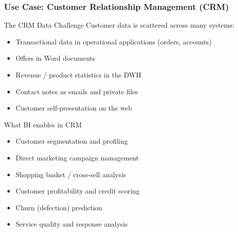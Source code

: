 \begin{frame}
  \frametitle{Use Case: Customer Relationship Management (CRM)}

  \begin{block}{The CRM Data Challenge}
    Customer data is scattered across many systems:
    \begin{itemize}
      \item Transactional data in operational applications (orders, accounts)
      \item Offers in Word documents
      \item Revenue / product statistics in the DWH
      \item Contact notes as emails and private files
      \item Customer self-presentation on the web
    \end{itemize}
  \end{block}

  \begin{block}{What BI enables in CRM}
    \begin{itemize}
      \item Customer segmentation and profiling
      \item Direct marketing campaign management
      \item Shopping basket / cross-sell analysis
      \item Customer profitability and credit scoring
      \item Churn (defection) prediction
      \item Service quality and response analysis
    \end{itemize}
  \end{block}
\end{frame}


